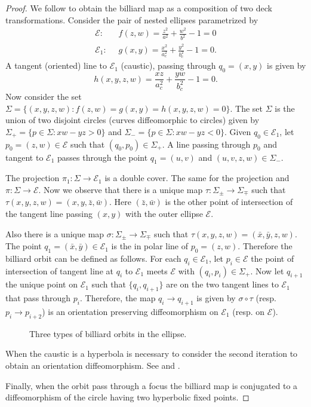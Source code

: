  \begin{proof} We follow \cite{bry} to obtain the billiard map as a composition of two deck transformations.  Consider the pair of nested   ellipses parametrized by \begin{align*}
     \mathcal{E}:&\;\; f(z,w)=\frac{z^2}{a^2}+\frac{w^2}{b^2}-1=0\\
     \mathcal{E}_1:&\;\; g(x,y)= \frac{x^2}{a_c^2}+\frac{y^2}{b_c^2}-1=0.
 \end{align*}
 A tangent (oriented) line to $\mathcal{E}_1$ (caustic), passing through $q_0=(x,y)$ is given by
 \[h(x,y,z,w) =\frac{xz}{a_c^2}+\frac{yw}{b_c^2}-1=0.\]
 Now consider the set
 $\Sigma= \{(x,y,z,w): f(z,w)=g(x,y)=h(x,y,z,w)=0\}.$  
 The set $\Sigma$ is the union of two disjoint circles (curves  diffeomorphic  to circles) given by
 $\Sigma_+=\{p\in \Sigma: xw-yz>0\} $ and
  $\Sigma_-=\{p\in \Sigma: xw-yz<0\}. $
  Given $q_0\in\mathcal{E}_1$, let $p_0=(z,w)\in \mathcal{E}$ such that $(q_0,p_0)\in\Sigma_+.$ A line passing through $p_0$ and tangent to $\mathcal{E}_1$ passes through the point $q_1=(u,v)$ and $(u,v,z,w)\in\Sigma_-.$
  
  The projection  $\pi_1:\Sigma \to \mathcal{E}_1$ is a double cover. The same for the projection
  and $\pi:\Sigma\to \mathcal{E}$. 
  Now we observe that there is a unique map $\tau:\Sigma_{\pm}\to \Sigma_{\mp}$ such that $\tau(x,y,z,w)=(x,y,\bar{z},\bar{w})$. Here $(\bar{z},\bar{w})$ is the other point of intersection of the tangent line passing $(x,y)$ with the outer ellipse $\mathcal{E}.$
  
Also there is a unique map $ \sigma:\Sigma_{\pm}\to \Sigma_{\mp}$ such that $\tau(x,y,z,w)=( \bar{x},\bar{y},z,w)$. The point $q_1=( \bar{x},\bar{y})\in\mathcal{E}_1$ is the in polar line of $p_0=(z,w).$ 
Therefore the billiard orbit can be defined as follows. For each $q_i\in \mathcal{E}_1$, let $p_i\in\mathcal{E}$ the point of intersection of tangent line at $q_i$ to $\mathcal{E}_1$ meets $\mathcal{E}$ with $(q_i,p_i)\in\Sigma_+.$ Now let $q_{i+1} $ the unique point on $\mathcal{E}_1$ such that $\{q_i,q_{i+1}\}$ are on the two tangent lines to $\mathcal{E}_1$ that pass through $p_i$. Therefore,   the map $q_i\to q_{i+1}$ is given by $\sigma\circ \tau $
  (resp. $p_i\to p_{i+2}$) is an orientation preserving diffeomorphism on $\mathcal{E}_1$ (resp. on $\mathcal{E}$).

\begin{figure}[H]
	\begin{center}
		\def\svgwidth{1.0\textwidth}
		
		\caption { Three types of billiard orbits in the ellipse.   \label{fig:caustic2}}
	\end{center}
\end{figure}

When the caustic is a hyperbola is necessary to consider the  second iteration to obtain an orientation diffeomorphism. See \cite{birkhoff_1922} and \cite{kolod_1985}.

Finally, when the orbit pass through a focus the billiard map is conjugated to a diffeomorphism of the circle having two hyperbolic fixed points.
 \end{proof}
